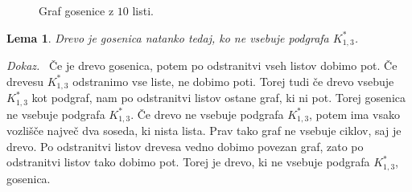 \documentclass[a4paper, 12pt]{book}
\newtheorem{lema}{Lema}[chapter]
\newenvironment{dokaz}{\emph{Dokaz.}\ }{\hspace{\fill}{$\Box$}}
\begin{document}
\begin{figure}[h]
    \begin{center}        
    \end{center}
    \caption{Graf gosenice z $10$ listi.}
    \label{graf_gosenice_10_listov}
\end{figure}


\begin{lema}
    Drevo je gosenica natanko tedaj, ko ne vsebuje podgrafa $K_{1,3}^*$.
\end{lema}
\begin{dokaz}
    Če je drevo gosenica, potem po odstranitvi vseh listov dobimo pot. Če drevesu $K_{1,3}^*$ odstranimo vse liste, ne dobimo poti. Torej tudi če drevo vsebuje $K_{1,3}^*$ kot podgraf, nam po odstranitvi listov ostane graf, ki ni pot. Torej gosenica ne vsebuje podgrafa $K_{1,3}^*$. Če drevo ne vsebuje podgrafa $K_{1,3}^*$, potem ima vsako vozlišče največ dva soseda, ki nista lista. Prav tako graf ne vsebuje ciklov, saj je drevo. Po odstranitvi listov drevesa vedno dobimo povezan graf, zato po odstranitvi listov tako dobimo pot. Torej je drevo, ki ne vsebuje podgrafa $K_{1,3}^*$, gosenica.
\end{dokaz}

        
\end{document}

